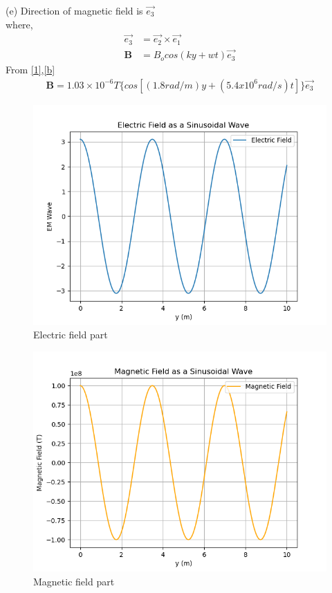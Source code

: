 \documentclass[journal,12pt,twocolumn]{IEEEtran}
\theoremstyle{remark}
\begin{document}
(e)
Direction of magnetic field is $\vec{e_3}$\\
where,
\begin{align}
	\vec{e_3}&=\vec{e_2} \times \vec{e_1}\\
	\textbf{B}&=B_ocos(ky+wt)\vec{e_3}\label{b}
\end{align}
 From \eqref{1},\eqref{b}
\begin{align}
	\textbf{B}=1.03\times10^{-6}T\{cos[(1.8rad/m)y+(5.4x10^{6}rad/s)t]\}\vec{e_3}
\end{align}
\begin{figure}[h]
\centering
\includegraphics[width=1\columnwidth]{Ewave.png}
\caption{Electric field part}
\label{solution}
\end{figure}
\begin{figure}[h]
\centering
\includegraphics[width=1\columnwidth]{Mwave.png}
\caption{Magnetic field part}
\label{solution}
\end{figure}
\end{document}
